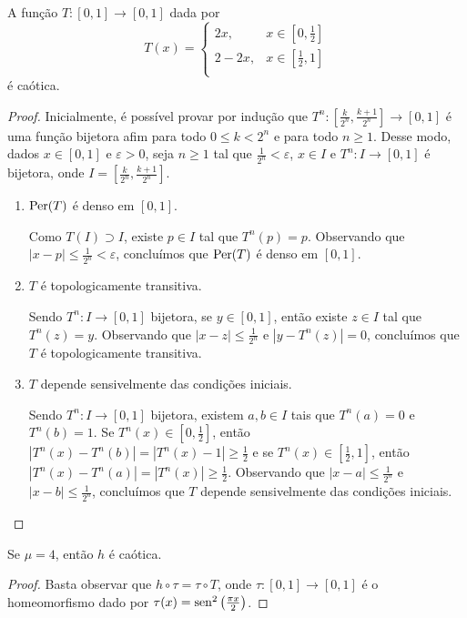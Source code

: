 \begin{lemma}
A função $T: [0,1] \to [0,1]$ dada por
\[ T(x) =
  \begin{cases}
    2x, & x \in \left[ 0, \frac{1}{2} \right] \\
    2 - 2x, & x \in \left[ \frac{1}{2}, 1 \right] \\
  \end{cases}
\]
é caótica.
\end{lemma}

\begin{proof}
Inicialmente, é possível provar por indução que $T^n: [\frac{k}{2^n}, \frac{k+1}{2^n}] \to [0,1]$ é uma função bijetora afim para todo $0 \leq k  < 2^n$ e para todo $n \geq 1$.
Desse modo, dados $x \in [0, 1]$ e $\varepsilon > 0$, seja $n \geq 1$ tal que $\frac{1}{2^n} < \varepsilon$, $x \in I$ e $T^n: I \to [0,1]$ é bijetora, onde $I = \left[\frac{k}{2^n}, \frac{k+1}{2^n}\right]$.

\begin{enumerate}[label=\alph*)]
\item $\operatorname{Per}(T)$ é denso em $[0, 1]$.

Como $T(I) \supset I$, existe $p \in I$ tal que $T^n(p) = p$. Observando que $|x-p| \leq \frac{1}{2^n} < \varepsilon$, concluímos que $\operatorname{Per}(T)$ é denso em $[0, 1]$.

\item $T$ é topologicamente transitiva.

Sendo $T^n: I \to [0,1]$ bijetora, se $y \in [0, 1]$, então existe $z \in I$ tal que $T^n(z) = y$.
Observando que $|x - z| \leq \frac{1}{2^n}$ e $|y - T^n(z)| = 0$, concluímos que $T$ é topologicamente transitiva.

\item $T$ depende sensivelmente das condições iniciais.

Sendo $T^n: I \to [0,1]$ bijetora, existem $a, b \in I$ tais que $T^n(a) = 0$ e $T^n(b) = 1$. Se $T^n(x) \in [0, \frac{1}{2}]$, então $|T^n(x) - T^n(b)| = |T^n(x) - 1| \geq \frac{1}{2}$ e se $T^n(x) \in [\frac{1}{2}, 1]$, então $|T^n(x) - T^n(a)| = |T^n(x)| \geq \frac{1}{2}$. Observando que $|x - a| \leq \frac{1}{2^n}$ e $|x - b| \leq \frac{1}{2^n}$, concluímos que $T$ depende sensivelmente das condições iniciais.
\end{enumerate}
\end{proof}

\begin{theorem}
Se $\mu = 4$, então $h$ é caótica.
\end{theorem}

\begin{proof}
Basta observar que $h \circ \tau = \tau \circ T$, onde $\tau: [0, 1] \to [0, 1]$ é o homeomorfismo dado por $\tau(x) = \operatorname{sen}^2\left(\frac{\pi x}{2}\right)$.
\end{proof}
